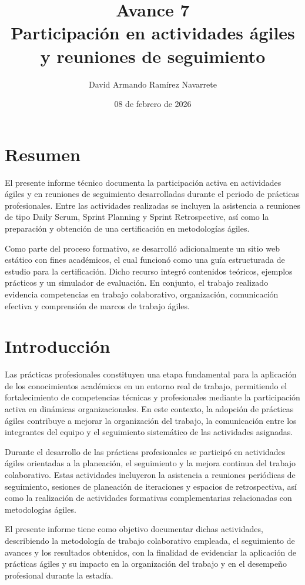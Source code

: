 \documentclass[12pt]{article}
\title{Avance 7 \\ Participación en actividades ágiles y reuniones de seguimiento}
\author{David Armando Ramírez Navarrete}
\date{08 de febrero de 2026}
\begin{document}
\maketitle

\section*{Resumen}
El presente informe técnico documenta la participación activa en actividades ágiles y en reuniones de seguimiento desarrolladas durante el periodo de prácticas profesionales. Entre las actividades realizadas se incluyen la asistencia a reuniones de tipo Daily Scrum, Sprint Planning y Sprint Retrospective, así como la preparación y obtención de una certificación en metodologías ágiles.

Como parte del proceso formativo, se desarrolló adicionalmente un sitio web estático con fines académicos, el cual funcionó como una guía estructurada de estudio para la certificación. Dicho recurso integró contenidos teóricos, ejemplos prácticos y un simulador de evaluación. En conjunto, el trabajo realizado evidencia competencias en trabajo colaborativo, organización, comunicación efectiva y comprensión de marcos de trabajo ágiles.


\section*{Introducción}
Las prácticas profesionales constituyen una etapa fundamental para la aplicación de los conocimientos académicos en un entorno real de trabajo, permitiendo el fortalecimiento de competencias técnicas y profesionales mediante la participación activa en dinámicas organizacionales. En este contexto, la adopción de prácticas ágiles contribuye a mejorar la organización del trabajo, la comunicación entre los integrantes del equipo y el seguimiento sistemático de las actividades asignadas.

Durante el desarrollo de las prácticas profesionales se participó en actividades ágiles orientadas a la planeación, el seguimiento y la mejora continua del trabajo colaborativo. Estas actividades incluyeron la asistencia a reuniones periódicas de seguimiento, sesiones de planeación de iteraciones y espacios de retrospectiva, así como la realización de actividades formativas complementarias relacionadas con metodologías ágiles.

El presente informe tiene como objetivo documentar dichas actividades, describiendo la metodología de trabajo colaborativo empleada, el seguimiento de avances y los resultados obtenidos, con la finalidad de evidenciar la aplicación de prácticas ágiles y su impacto en la organización del trabajo y en el desempeño profesional durante la estadía.
\end{document}
